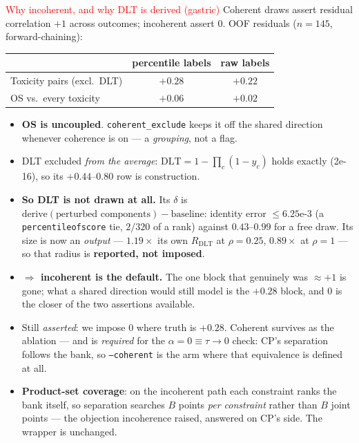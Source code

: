 \documentclass{beamer}
\newcommand{\mc}[1]{\textcolor{red}{#1}}
\begin{document}
\begin{frame}{\mc{Why incoherent, and why DLT is derived (gastric)}}
  \small
  Coherent draws assert residual correlation $+1$ across outcomes;
  incoherent assert $0$. OOF residuals ($n=145$, forward-chaining):
  \begin{center}\small
  \begin{tabular}{@{}lcc@{}}
    \toprule
    & percentile labels & raw labels \\
    \midrule
    Toxicity pairs (excl.\ DLT) & $+0.28$ & $+0.22$ \\
    OS vs.\ every toxicity      & $+0.06$ & $+0.02$ \\
    \bottomrule
  \end{tabular}
  \end{center}
  \medskip
  \begin{itemize}
    \item \textbf{OS is uncoupled}. \texttt{coherent\_exclude} keeps it off the
      shared direction whenever coherence is on --- a \emph{grouping}, not a flag.
    \item DLT excluded \emph{from the average}: $\text{DLT}=1-\prod_c(1-y_c)$
      holds exactly (2e-16), so its $+0.44$--$0.80$ row is construction.
    \item \textbf{So DLT is not drawn at all.} Its $\delta$ is
      $\text{derive}(\text{perturbed components})-\text{baseline}$: identity error
      $\le 6.25$e-3 (a \texttt{percentileofscore} tie, $2/320$ of a rank) against
      $0.43$--$0.99$ for a free draw. Its size is now an \emph{output} ---
      $1.19\times$ its own $R_{\text{DLT}}$ at $\rho{=}0.25$, $0.89\times$ at
      $\rho{=}1$ --- so that radius is \textbf{reported, not imposed}.
    \item \textbf{$\Rightarrow$ incoherent is the default.} The one block that
      genuinely was $\approx+1$ is gone; what a shared direction would still model
      is the $+0.28$ block, and $0$ is the closer of the two assertions available.
    \item Still \emph{asserted}: we impose $0$ where truth is $+0.28$. Coherent
      survives as the ablation --- and is \emph{required} for the
      $\alpha{=}0\equiv\tau\to0$ check: CP's separation follows the bank, so
      \texttt{--coherent} is the arm where that equivalence is defined at all.
    \item \textbf{Product-set coverage}: on the incoherent path each constraint
      ranks the bank itself, so separation searches $B$ points \emph{per
      constraint} rather than $B$ joint points --- the objection incoherence
      raised, answered on CP's side. The wrapper is unchanged.
  \end{itemize}
\end{frame}
\end{document}
